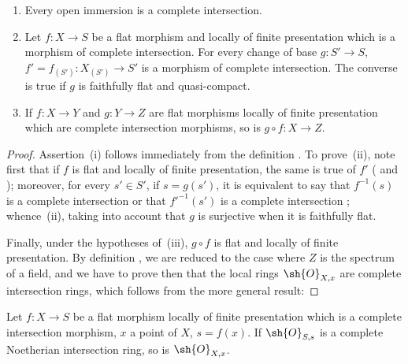 \begin{proposition}[19.3.9]
\label{IV.19.3.9}
\medskip\noindent
\begin{enumerate}[label=(\roman*)]
  \item Every open immersion is a complete intersection.
  \item Let $f:X\to S$ be a flat morphism and locally of finite presentation which is a morphism of complete intersection.
For every change of base $g:S'\to S$, $f'=f_{(S')}:X_{(S')}\to S'$ is a morphism of complete intersection.
The converse is true if $g$ is faithfully flat and quasi-compact.
  \item If $f:X\to Y$ and $g:Y\to Z$ are flat morphisms locally of finite presentation which are complete intersection morphisms, so is $g\circ f:X\to Z$.
\end{enumerate}
\end{proposition}

\begin{proof}
Assertion~(i) follows immediately from the definition .
To prove~(ii), note first that if $f$ is flat and locally of finite presentation, the same is true of $f'$ ( and ); moreover, for every $s'\in S'$, if $s=g(s')$, it is equivalent to say that $f^{-1}(s)$ is a complete intersection or that $f'^{-1}(s')$ is a complete intersection ; whence~(ii), taking into account that $g$ is surjective when it is faithfully flat.

Finally, under the hypotheses of~(iii), $g\circ f$ is flat and locally of finite presentation.
By definition , we are reduced to the case where $Z$ is the spectrum of a field, and we have to prove then that the local rings $\sh{O}_{X,x}$ are complete intersection rings, which follows from the more general result:
\end{proof}

\begin{corollary}[19.3.10]
\label{IV.19.3.10}
Let $f:X\to S$ be a flat morphism locally of finite presentation which is a complete intersection morphism, $x$ a point of $X$, $s=f(x)$.
If $\sh{O}_{S,s}$ is a complete Noetherian intersection ring, so is $\sh{O}_{X,x}$.
\end{corollary}

